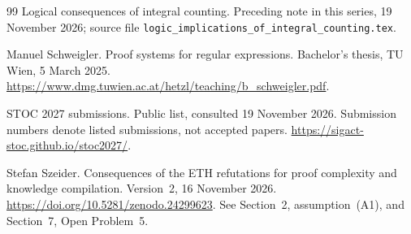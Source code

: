 \documentclass[11pt]{article}
\theoremstyle{definition}
\theoremstyle{remark}
\begin{document}
\begin{thebibliography}{99}
\newblock Logical consequences of integral counting.
\newblock Preceding note in this series, 19 November 2026; source file
\texttt{logic\_implications\_of\_integral\_counting.tex}.

 Manuel Schweigler.
\newblock Proof systems for regular expressions.
\newblock Bachelor's thesis, TU Wien, 5 March 2025.
\newblock \url{https://www.dmg.tuwien.ac.at/hetzl/teaching/b_schweigler.pdf}.

 STOC 2027 submissions.
\newblock Public list, consulted 19 November 2026. Submission numbers
denote listed submissions, not accepted papers.
\newblock \url{https://sigact-stoc.github.io/stoc2027/}.

 Stefan Szeider.
\newblock Consequences of the ETH refutations for proof complexity and
knowledge compilation.
\newblock Version~2, 16 November 2026.
\newblock \url{https://doi.org/10.5281/zenodo.24299623}.
\newblock See Section~2, assumption~(A1), and Section~7, Open Problem~5.

\end{thebibliography}
\end{document}
